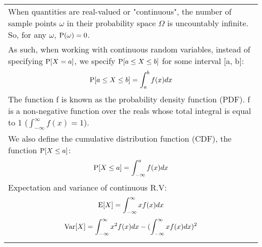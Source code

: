 {\tabulinesep=1mm
\begin{tabu}{|p{16cm} |}
\hline
When quantities are real-valued or "continuous", the number of sample points $\omega$ in their probability space $\Omega$ is uncountably infinite. So, for any $\omega$, $\P(\omega) = 0$.  \\
As such, when working with continuous random variables, instead of specifying $\P[X = a]$, we specify $\P[a \leq X \leq b]$ for some interval [a, b]:
\[\P[a \leq X \leq b]  = \int_{a}^{b} f(x) dx\]
The function f is known as the probability density function (PDF). f is a non-negative function over the reals whose total integral is equal to 1 ($\int_{-\infty}^{\infty} f(x) = 1$). \\
We also define the cumulative distribution function (CDF), the function $\P[X \leq a]$:
\[\P[X \leq a] = \int_{-\infty}^{a} f(x)dx \]
Expectation and variance of continuous R.V:
\[\E[X] = \int_{-\infty}^{\infty} xf(x)dx \]
\[\var[X] = \int_{-\infty}^{\infty} x^2f(x)dx - (\int_{-\infty}^{\infty} xf(x)dx)^2 \]
\\
\hline
\end{tabu}
}
